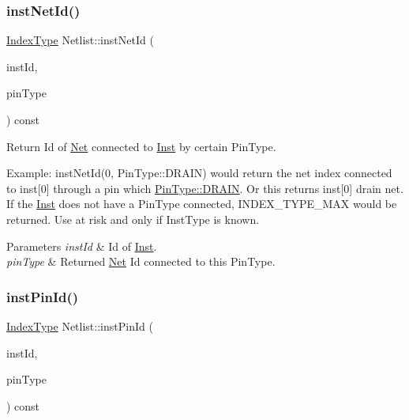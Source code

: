 \subsubsection{\texorpdfstring{inst\+Net\+Id()}{instNetId()}}
{\footnotesize\ttfamily \hyperlink{type_8h_a581e8093e28e7362f2b6937296190676}{Index\+Type} Netlist\+::inst\+Net\+Id (\begin{DoxyParamCaption}\item[{\hyperlink{type_8h_a581e8093e28e7362f2b6937296190676}{Index\+Type}}]{inst\+Id,  }\item[{\hyperlink{type_8h_afaab50027002ecbb6c8ac27e727d1bb4}{Pin\+Type}}]{pin\+Type }\end{DoxyParamCaption}) const}



Return Id of \hyperlink{classNet}{Net} connected to \hyperlink{classInst}{Inst} by certain Pin\+Type. 

Example\+: inst\+Net\+Id(0, Pin\+Type\+::\+D\+R\+A\+I\+N) would return the net index connected to inst\mbox{[}0\mbox{]} through a pin which \hyperlink{type_8h_afaab50027002ecbb6c8ac27e727d1bb4ad22e8f7ce637479aeffe9dab9ee7337d}{Pin\+Type\+::\+D\+R\+A\+IN}. Or this returns inst\mbox{[}0\mbox{]} drain net. If the \hyperlink{classInst}{Inst} does not have a Pin\+Type connected, I\+N\+D\+E\+X\+\_\+\+T\+Y\+P\+E\+\_\+\+M\+AX would be returned. Use at risk and only if Inst\+Type is known.


\begin{DoxyParams}{Parameters}
{\em inst\+Id} & Id of \hyperlink{classInst}{Inst}. \\
\hline
{\em pin\+Type} & Returned \hyperlink{classNet}{Net} Id connected to this Pin\+Type. \\
\hline
\end{DoxyParams}
\mbox{\label{classNetlist_a981030068cfb1eb1ce360ee6c943513a}} 
\subsubsection{\texorpdfstring{inst\+Pin\+Id()}{instPinId()}}
{\footnotesize\ttfamily \hyperlink{type_8h_a581e8093e28e7362f2b6937296190676}{Index\+Type} Netlist\+::inst\+Pin\+Id (\begin{DoxyParamCaption}\item[{\hyperlink{type_8h_a581e8093e28e7362f2b6937296190676}{Index\+Type}}]{inst\+Id,  }\item[{\hyperlink{type_8h_afaab50027002ecbb6c8ac27e727d1bb4}{Pin\+Type}}]{pin\+Type }\end{DoxyParamCaption}) const}



